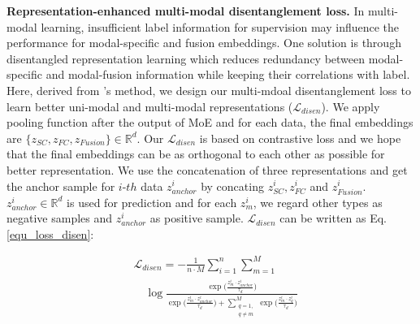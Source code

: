 \documentclass[10pt,twocolumn,letterpaper]{article}
\begin{document}

\vspace{0.35em}
\noindent\textbf{Representation-enhanced multi-modal disentanglement loss.} In multi-modal learning, insufficient label information for supervision may influence the performance for modal-specific and fusion embeddings. One solution is through disentangled representation learning which reduces redundancy between modal-specific and modal-fusion information while keeping their correlations with label. Here, derived from \cite{li2022modeling}'s method, we design our multi-mdoal disentanglement loss to learn better uni-modal and multi-modal representations ($\mathcal{L}_{disen}$). We apply pooling function after the output of MoE and for each data, the final embeddings are $\{z_{SC}, z_{FC}, z_{Fusion}\} \in \mathbb{R}^d$. Our $\mathcal{L}_{disen}$ is based on contrastive loss and we hope that the final embeddings can be as orthogonal to each other as possible for better representation. We use the concatenation of three representations and get the anchor sample for $i\mbox{-}th$ data $z^i_{anchor}$ by concating $ z^i_{SC}, z^i_{FC}$ and $z^i_{Fusion}$. 
$z^i_{anchor} \in \mathbb{R}^d$ is used for prediction and for each $z_m^i$, we regard other types as negative samples and $z^i_{anchor}$ as positive sample. 
$\mathcal{L}_{disen}$ can be written as Eq. \ref{equ_loss_disen}:
\begin{small}
\begin{equation}
\begin{aligned}
&\mathcal{L}_{disen} =  -\frac{1}{n\cdot M}\sum_{i=1}^{n}\sum_{m=1}^{M}
\\
&  \quad 
\log
\frac{
\exp 
    \big(
        \frac{z_m^i \cdot z_{anchor}^{i}}{\tau_d} 
    \big)
}
{
\exp\big(
        \frac{z_m^i \cdot z_{anchor}^{i}}{\tau_d} 
    \big) + 
    \sum_{\substack{q=1, \\ q \not = m}}^{M} \exp \big(
                                    \frac{z_m^i \cdot z_q^i}{\tau_d}
                                    \big)
}
\label{equ_loss_disen}
\end{aligned}
\end{equation}
\end{small}
\end{document}
